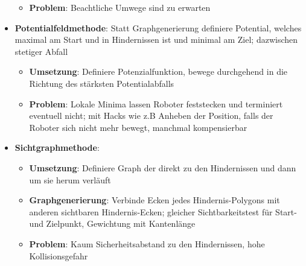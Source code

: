 \begin{itemize}
\begin{itemize}
		\item \textbf{Problem}: Beachtliche Umwege sind zu erwarten
	\end{itemize}
	\item \textbf{Potentialfeldmethode}: Statt Graphgenerierung definiere Potential, welches maximal am Start und in Hindernissen ist und minimal am Ziel; dazwischen stetiger Abfall
	\begin{itemize}
		\item \textbf{Umsetzung}: Definiere Potenzialfunktion, bewege durchgehend in die Richtung des stärksten Potentialabfalls
		\item \textbf{Problem}: Lokale Minima lassen Roboter feststecken und terminiert eventuell nicht; mit Hacks wie z.B Anheben der Position, falls der Roboter sich nicht mehr bewegt, manchmal kompensierbar 
	\end{itemize}
	\item \textbf{Sichtgraphmethode}: 
	\begin{itemize}
		\item \textbf{Umsetzung}: Definiere Graph der direkt zu den Hindernissen und dann um sie herum verläuft
		\item \textbf{Graphgenerierung}: Verbinde Ecken jedes Hindernis-Polygons mit anderen sichtbaren Hindernis-Ecken; gleicher Sichtbarkeitstest für Start- und Zielpunkt, Gewichtung mit Kantenlänge
		\item \textbf{Problem}: Kaum Sicherheitsabstand zu den Hindernissen, hohe Kollisionsgefahr
	\end{itemize}
\end{itemize}